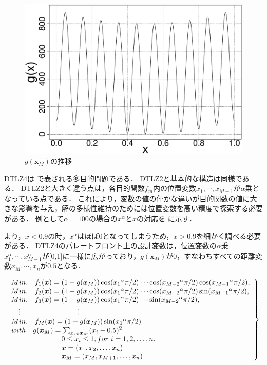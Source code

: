 \documentclass[../main/main]{subfiles}
\begin{document}
\begin{figure}[htbp]
\begin{center}
\includegraphics[width=0.65\linewidth]{../figures/DTLZ3_gx.eps}
\end{center}
\setlength{\abovecaptionskip}{-8mm}
\setlength{\belowcaptionskip}{0mm}
\caption{$g(\bm{x}_M)$の推移}
\label{fig:dtlz3_gx}
\end{figure}

\clearpage
{}
DTLZ4は    で表される多目的問題である．
DTLZ2と基本的な構造は同様である．
DTLZ2と大きく違う点は，各目的関数$f_m$内の位置変数$x_1,\cdots,x_{M-1}$が$\alpha$乗となっている点である．
これにより，変数の値の僅かな違いが目的関数の値に大きな影響を与え，解の多様性維持のためには位置変数を高い精度で探索する必要がある．
例として$\alpha=100$の場合の$x^\alpha$と$x$の対応を に示す．

より，$x < 0.9$の時，$x^\alpha$はほぼ0となってしまうため，$x > 0.9$を細かく調べる必要がある．
DTLZ4のパレートフロント上の設計変数は，位置変数の$\alpha$乗$x^\alpha _1,\cdots,x^\alpha _{M-1}$が[0,1]に一様に広がっており，$g(\bm{x}_M)$が$0$，すなわちすべての距離変数$x_M,\cdots,x_n$が$0.5$となる．

\begin{eqnarray} 
\left.
\begin{array}{ll}
Min. \quad f_{1}  (\bm{x}) = (1+g(\bm{x}_{M}))\cos({x_{1}}^\alpha\pi/2)  \cdots  \cos({x_{M-2}}^\alpha\pi/2)\cos({x_{M-1}}^\alpha\pi/2),\\
Min. \quad f_{2} (\bm{x}) = (1+g(\bm{x}_{M}))\cos({x_{1}}^\alpha\pi/2)  \cdots  \cos({x_{M-2}}^\alpha\pi/2)\sin({x_{M-1}}^\alpha\pi/2), \\
Min. \quad f_{3} (\bm{x}) = (1+g(\bm{x}_{M}))\cos({x_{1}}^\alpha\pi/2)  \cdots  \sin({x_{M-2}}^\alpha\pi/2), \\
     \  \  \ $\vdots$    \qquad     \qquad      \qquad     \qquad \vdots \\
Min. \quad f_{M}(\bm{x}) = (1+g(\bm{x}_{M}))\sin({x_{1}}^\alpha\pi/2)\\
with \quad g(\bm{x}_{M}) = \sum_{x_i \in \bm{x}_M} (x_i - 0.5)^2  \\
  \qquad    \qquad    \qquad  \quad      0 \le x_{i} \le 1,  for \ i = 1, 2, \ldots, n. \\
        \qquad    \qquad    \qquad  \quad        \bm x = (x_1,x_2, \ldots, x_n)\\
   \qquad    \qquad    \qquad  \quad        \bm{x}_M = (x_M,x_{M+1}, \ldots, x_n)
   \label{dtlz4} 
\end{array}
\right\}
\end{eqnarray}
\end{document}
